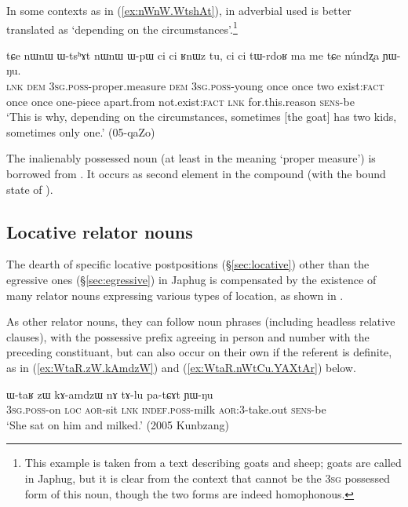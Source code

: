 In some contexts as in (\ref{ex:nWnW.WtshAt}),  in adverbial used is better translated as `depending on the circumstances'.\footnote{This example is taken from a text describing goats and sheep; goats are called  in Japhug, but it is clear from the context that  cannot be the \textsc{3sg} possessed form of this noun, though the two forms are indeed homophonous. }

\begin{exe}
\ex \label{ex:nWnW.WtshAt}
\gll tɕe nɯnɯ ɯ-tsʰɤt nɯnɯ ɯ-pɯ ci ci ʁnɯz tu, ci ci tɯ-rdoʁ ma me tɕe núndʐa ɲɯ-ŋu. \\
\textsc{lnk} \textsc{dem} \textsc{3sg}.\textsc{poss}-proper.measure \textsc{dem}  \textsc{3sg}.\textsc{poss}-young once once two exist:\textsc{fact} once once one-piece apart.from not.exist:\textsc{fact} \textsc{lnk} for.this.reason \textsc{sens}-be \\
\glt `This is why, depending on the circumstances, sometimes [the goat] has two kids, sometimes only one.' (05-qaZo)
\end{exe}

The inalienably possessed noun   (at least in the meaning `proper measure') is borrowed from . It occurs as second element in the compound (with the bound state  of ).

\subsection{Locative relator nouns} \label{sec:relator.location}
The dearth of specific locative postpositions (§\ref{sec:locative}) other than the egressive ones (§\ref{sec:egressive}) in Japhug is compensated by the existence of many relator nouns expressing various types of location, as shown in . 

As other relator nouns, they can follow noun phrases (including headless relative clauses), with the possessive prefix agreeing in person and number with the preceding constituant, but can also occur on their own if the referent is definite, as  in (\ref{ex:WtaR.zW.kAmdzW}) and (\ref{ex:WtaR.nWtCu.YAXtAr}) below.

\begin{exe}
\ex \label{ex:WtaR.zW.kAmdzW}
\gll  ɯ-taʁ zɯ kɤ-amdzɯ nɤ tɤ-lu pa-tɕɤt ɲɯ-ŋu\\
\textsc{3sg}.\textsc{poss}-on \textsc{loc} \textsc{aor}-sit \textsc{lnk} \textsc{indef}.\textsc{poss}-milk \textsc{aor}:3\flobv{}-take.out \textsc{sens}-be\\
\glt `She sat on him and milked.' (2005 Kunbzang)
\end{exe}

